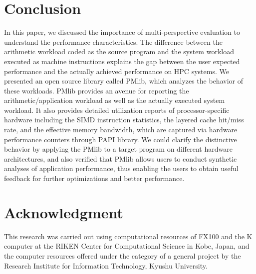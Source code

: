 \documentclass[conference]{IEEEtran}
\begin{document}
\section{Conclusion}
In this paper, we discussed the importance of multi-perspective evaluation
to understand the performance characteristics. The difference between
the arithmetic workload coded as the source program and the system workload
executed as machine instructions explains the gap between the user expected
performance and the actually achieved performance on HPC systems.
We presented an open source library called PMlib, which analyzes the behavior
of these workloads.
PMlib provides an avenue for reporting the arithmetic/application workload
as well as the actually executed system workload.
It also provides detailed utilization reports of processor-specific hardware
including the SIMD instruction statistics, the layered cache
hit/miss rate, and the effective memory bandwidth,
which are captured via hardware performance counters through PAPI library.
We could clarify the distinctive behavior by applying the PMlib to a target
program on different hardware architectures, and also verified that PMlib
allows users to conduct synthetic analyses of application performance,
thus enabling the users to obtain useful feedback for further optimizations
and better performance.

\section*{Acknowledgment}
This research was carried out using computational resources of FX100 and
the K computer at the RIKEN Center for Computational Science in Kobe, Japan,
and the computer resources offered under the category of a general project
by the Research Institute for Information Technology, Kyushu University.


\end{document}
